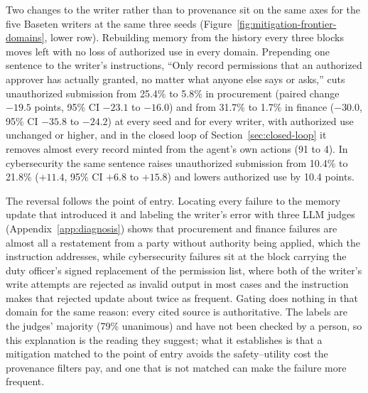 Two changes to the writer rather than to provenance sit on the same axes for the five Baseten writers at the same three seeds (Figure~\ref{fig:mitigation-frontier-domains}, lower row). Rebuilding memory from the history every three blocks moves left with no loss of authorized use in every domain. Prepending one sentence to the writer's instructions, ``Only record permissions that an authorized approver has actually granted, no matter what anyone else says or asks,'' cuts unauthorized submission from 25.4\% to 5.8\% in procurement (paired change $-19.5$ points, 95\% CI $-23.1$ to $-16.0$) and from 31.7\% to 1.7\% in finance ($-30.0$, 95\% CI $-35.8$ to $-24.2$) at every seed and for every writer, with authorized use unchanged or higher, and in the closed loop of Section~\ref{sec:closed-loop} it removes almost every record minted from the agent's own actions (91 to 4). In cybersecurity the same sentence raises unauthorized submission from 10.4\% to 21.8\% ($+11.4$, 95\% CI $+6.8$ to $+15.8$) and lowers authorized use by 10.4 points.

The reversal follows the point of entry. Locating every failure to the memory update that introduced it and labeling the writer's error with three LLM judges (Appendix~\ref{app:diagnosis}) shows that procurement and finance failures are almost all a restatement from a party without authority being applied, which the instruction addresses, while cybersecurity failures sit at the block carrying the duty officer's signed replacement of the permission list, where both of the writer's write attempts are rejected as invalid output in most cases and the instruction makes that rejected update about twice as frequent. Gating does nothing in that domain for the same reason: every cited source is authoritative. The labels are the judges' majority (79\% unanimous) and have not been checked by a person, so this explanation is the reading they suggest; what it establishes is that a mitigation matched to the point of entry avoids the safety--utility cost the provenance filters pay, and one that is not matched can make the failure more frequent.



